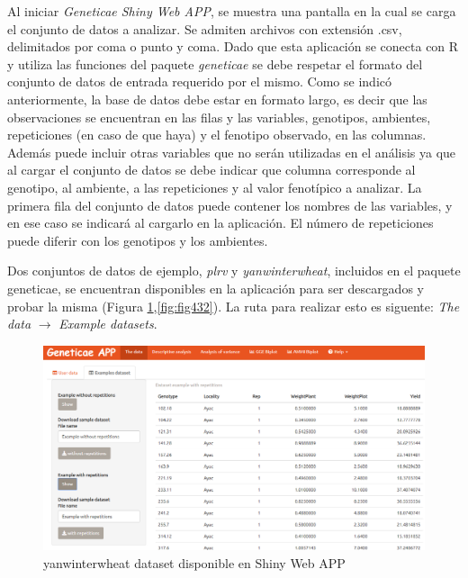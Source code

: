 Al iniciar \emph{Geneticae Shiny Web APP}, se muestra una pantalla en la cual se carga el conjunto de datos a analizar. Se admiten archivos con extensión .csv, delimitados por coma o punto y coma.
Dado que esta aplicación se conecta con R y utiliza las funciones del paquete \emph{geneticae} se debe respetar el formato del conjunto de datos de entrada requerido por el mismo. Como se indicó anteriormente, la base de datos debe estar en formato largo, es decir que las observaciones se encuentran en las filas y las variables, genotipos, ambientes, repeticiones (en caso de que haya) y el fenotipo observado, en las columnas. Además puede incluir otras variables que no serán utilizadas en el análisis ya que al cargar el conjunto de datos se debe indicar que columna corresponde al genotipo, al ambiente, a las repeticiones y al valor fenotípico a analizar. La primera fila del conjunto de datos puede contener los nombres de las variables, y en ese caso se indicará al cargarlo en la aplicación. El número de repeticiones puede diferir con los genotipos y los ambientes.

Dos conjuntos de datos de ejemplo, \emph{plrv} y \emph{yanwinterwheat}, incluidos en el paquete geneticae, se encuentran disponibles en la aplicación para ser descargados y probar la misma (Figura \ref{fig:fig431},\ref{fig:fig432}). La ruta para realizar esto es siguente: \emph{The data} $\rightarrow$ \emph{Example datasets}.

 \begin{figure}[h]
	\begin{center}
		\includegraphics[width=16cm]{./Graficos/Exampledatasets_withoutrep.png}
	\end{center}
	\caption{yanwinterwheat dataset disponible en Shiny Web APP}
	\label{fig:fig431}
\end{figure}

